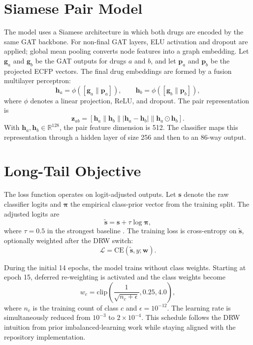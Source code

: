 \documentclass[12pt,a4paper]{report}
\begin{document}
\section{Siamese Pair Model}
The model uses a Siamese architecture in which both drugs are encoded by the same GAT backbone. For non-final GAT layers, ELU activation and dropout are applied; global mean pooling converts node features into a graph embedding. Let \(\mathbf{g}_a\) and \(\mathbf{g}_b\) be the GAT outputs for drugs \(a\) and \(b\), and let \(\mathbf{p}_a\) and \(\mathbf{p}_b\) be the projected ECFP vectors. The final drug embeddings are formed by a fusion multilayer perceptron:
\begin{equation}
\mathbf{h}_a = \phi([\mathbf{g}_a \| \mathbf{p}_a]), \qquad
\mathbf{h}_b = \phi([\mathbf{g}_b \| \mathbf{p}_b]),
\end{equation}
where \(\phi\) denotes a linear projection, ReLU, and dropout. The pair representation is
\begin{equation}
\mathbf{z}_{ab} = [\mathbf{h}_a \| \mathbf{h}_b \| |\mathbf{h}_a - \mathbf{h}_b| \| \mathbf{h}_a \odot \mathbf{h}_b].
\end{equation}
With \(\mathbf{h}_a, \mathbf{h}_b \in \mathbb{R}^{128}\), the pair feature dimension is 512. The classifier maps this representation through a hidden layer of size 256 and then to an 86-way output.

\section{Long-Tail Objective}
The loss function operates on logit-adjusted outputs. Let \(\mathbf{s}\) denote the raw classifier logits and \(\boldsymbol{\pi}\) the empirical class-prior vector from the training split. The adjusted logits are
\begin{equation}
\tilde{\mathbf{s}} = \mathbf{s} + \tau \log \boldsymbol{\pi},
\end{equation}
where \(\tau = 0.5\) in the strongest baseline \cite{menon2021logit}. The training loss is cross-entropy on \(\tilde{\mathbf{s}}\), optionally weighted after the DRW switch:
\begin{equation}
\mathcal{L} = \mathrm{CE}(\tilde{\mathbf{s}}, y; \mathbf{w}).
\end{equation}

During the initial 14 epochs, the model trains without class weights. Starting at epoch 15, deferred re-weighting is activated and the class weights become
\begin{equation}
w_c = \mathrm{clip}\left(\frac{1}{\sqrt{n_c + \epsilon}}, 0.25, 4.0 \right),
\end{equation}
where \(n_c\) is the training count of class \(c\) and \(\epsilon = 10^{-12}\). The learning rate is simultaneously reduced from \(10^{-3}\) to \(2 \times 10^{-4}\). This schedule follows the DRW intuition from prior imbalanced-learning work \cite{cao2019ldam} while staying aligned with the repository implementation.
\end{document}
